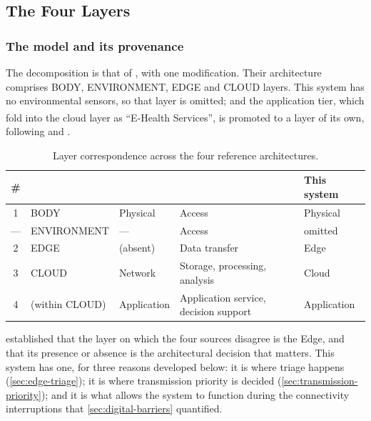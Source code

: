 \documentclass[12pt,a4paper,oneside]{report}
\newcommand{\bq}[1]{``#1''\textsuperscript{\dag}}
\begin{document}
\subsection{The Four Layers}\label{sec:layers}

\subsubsection{The model and its provenance}

The decomposition is that of \textcite{mucchi2021}, with one modification. Their architecture comprises BODY, ENVIRONMENT, EDGE and CLOUD layers. This system has no environmental sensors, so that layer is omitted; and the application tier, which \textcite{mucchi2021} fold into the cloud layer as \bq{E-Health Services}, is promoted to a layer of its own, following \textcite{efendi2025} and \textcite{liu2025review}.

\begin{table}[htbp]
\centering\small
\caption{Layer correspondence across the four reference architectures.}\label{tab:layer-map}
\begin{tabularx}{\textwidth}{@{}c >{\raggedright\arraybackslash}p{2.4cm} >{\raggedright\arraybackslash}p{2.2cm} >{\raggedright\arraybackslash}p{3.4cm} X@{}}
\toprule
\textbf{\#} & \textbf{\textcite{mucchi2021}} & \textbf{\textcite{efendi2025}} & \textbf{\textcite{liu2025review}} & \textbf{This system} \\
\midrule
1 & BODY & Physical & Access & Physical \\
--- & ENVIRONMENT & --- & Access & omitted \\
2 & EDGE & (absent) & Data transfer & Edge \\
3 & CLOUD & Network & Storage, processing, analysis & Cloud \\
4 & (within CLOUD) & Application & Application service, decision support & Application \\
\bottomrule
\end{tabularx}
\end{table}

 established that the layer on which the four sources disagree is the Edge, and that its presence or absence is the architectural decision that matters. This system has one, for three reasons developed below: it is where triage happens (\cref{sec:edge-triage}); it is where transmission priority is decided (\cref{sec:transmission-priority}); and it is what allows the system to function during the connectivity interruptions that \cref{sec:digital-barriers} quantified.
\end{document}
